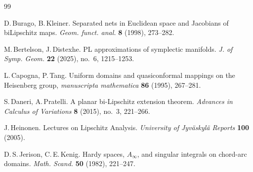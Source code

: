 \documentclass[12pt]{article}
\theoremstyle{definition}
\begin{document}
\begin{thebibliography}{99}


D.\,Burago, B.\,Kleiner.
Separated nets in Euclidean space and Jacobians of biLipschitz maps.
{\it Geom. funct. anal.} {\bf 8} (1998), 273--282.

M.\,Bertelson, J.\,Distexhe.
PL approximations of symplectic manifolds.
{\it J. of Symp. Geom.} {\bf 22} (2025), no.~6, 1215--1253.


L.\,Capogna, P.\,Tang.
Uniform domains and quasiconformal mappings on the Heisenberg group,
{\it manuscripta mathematica} {\bf 86} (1995), 267--281.



S.\,Daneri, A.\,Pratelli.
A planar bi-Lipschitz extension theorem.
{\it Advances in Calculus of Variations} {\bf8} (2015), no.~3, 221--266.




J.\,Heinonen.
Lectures on Lipschitz Analysis.
\emph{University of Jyv\"askyl\"a Reports} {\bf100} (2005).

D.\,S.\,Jerison, C.\,E.\,Kenig.
Hardy spaces, $A_{\infty}$, and singular integrals on chord-arc domains.
{\it Math. Scand.} {\bf50} (1982), 221--247. 



\end{thebibliography}
\end{document}
